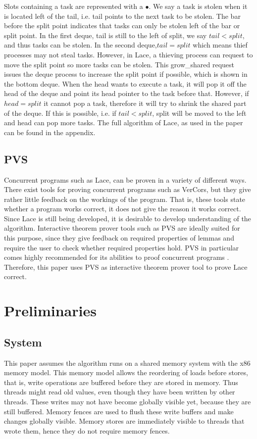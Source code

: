 \documentclass{sig-alternate-br}
\begin{document}
Slots containing a task are represented with a $\bullet$.
We say a task is stolen when it is located left of the tail, i.e. tail points to the next task to be stolen.
The bar before the split point indicates that tasks can only be stolen left of the bar or split point.
In the first deque, tail is still to the left of split, we say $tail < split$, and thus tasks can be stolen.
In the second deque,$ tail = split$ which means thief processes may not steal tasks.
However, in Lace, a thieving process can request to move the split point so more tasks can be stolen.
This grow\_shared request issues the deque process to increase the split point if possible, which is shown in the bottom deque.
When the head wants to execute a task, it will pop it off the head of the deque and point its head pointer to the task before that.
However, if $head = split$ it cannot pop a task, therefore it will try to shrink the shared part of the deque.
If this is possible, i.e. if $tail < split$, split will be moved to the left and head can pop more tasks.
The full algorithm of Lace, as used in the paper can be found in the appendix.

\subsection{PVS}
Concurrent programs such as Lace, can be proven in a variety of different ways.
There exist tools for proving concurrent programs such as VerCors\cite{eemcs24905}, but they give rather little feedback on the workings of the program.
That is, these tools state whether a program works correct, it does not give the reason it works correct.
Since Lace is still being developed, it is desirable to develop understanding of the algorithm.
Interactive theorem prover tools such as PVS are ideally suited for this purpose, since they give feedback on required properties of lemmas and require the user to check whether required properties hold.
PVS in particular comes highly recommended for its abilities to proof concurrent programs\cite{colvin2006formal} \cite{shankar1993verification}.
Therefore, this paper uses PVS as interactive theorem prover tool to prove Lace correct.

\section{Preliminaries}
\subsection{System}
This paper assumes the algorithm runs on a shared memory system with the x86 memory model.
This memory model allows the reordering of loads before stores, that is, write operations are buffered before they are stored in memory.
Thus threads might read old values, even though they have been written by other threads.
These writes may not have become globally visible yet, because they are still buffered.
Memory fences are used to flush these write buffers and make changes globally visible.
Memory stores are immediately visible to threads that wrote them, hence they do not require memory fences.
\end{document}
